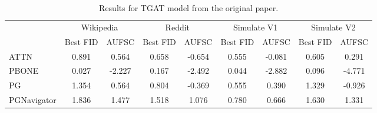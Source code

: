 \begin{table}
\centering
\begin{tabular}{lcccccccc}
\toprule
 & \multicolumn{2}{c}{Wikipedia} & \multicolumn{2}{c}{Reddit} & \multicolumn{2}{c}{Simulate V1} & \multicolumn{2}{c}{Simulate V2} \\
 & Best FID & AUFSC & Best FID & AUFSC & Best FID & AUFSC & Best FID & AUFSC \\
\midrule
ATTN & 0.891 & 0.564 & 0.658 & -0.654 & 0.555 & -0.081 & 0.605 & 0.291 \\
PBONE & 0.027 & -2.227 & 0.167 & -2.492 & 0.044 & -2.882 & 0.096 & -4.771 \\
PG & 1.354 & 0.564 & 0.804 & -0.369 & 0.555 & 0.390 & 1.329 & -0.926 \\
PGNavigator & 1.836 & 1.477 & 1.518 & 1.076 & 0.780 & 0.666 & 1.630 & 1.331 \\
\bottomrule
\end{tabular}
\caption{\label{tab:tgat_results_og}Results for TGAT model from the original paper.}
\end{table}
